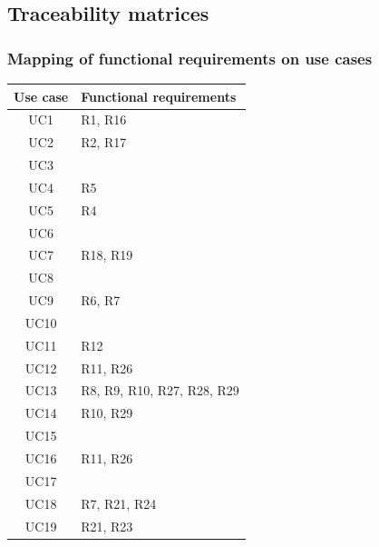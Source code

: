 \subsection{Traceability matrices}

\subsubsection*{Mapping of functional requirements on use cases}
\begin{center}
    \def\arraystretch{1.5}
    \begin{longtable}[H]{|c|l|}
        \hline
        \textbf{Use case} & \textbf{Functional requirements} \\ \hline
        UC1               & R1, R16                          \\ \hline
        UC2               & R2, R17                          \\ \hline
        UC3               &                                  \\ \hline
        UC4               & R5                               \\ \hline
        UC5               & R4                               \\ \hline
        UC6               &                                  \\ \hline
        UC7               & R18, R19                         \\ \hline
        UC8               &                                  \\ \hline
        UC9               & R6, R7                           \\ \hline
        UC10              &                                  \\ \hline
        UC11              & R12                              \\ \hline
        UC12              & R11, R26                         \\ \hline
        UC13              & R8, R9, R10, R27, R28, R29       \\ \hline
        UC14              & R10, R29                         \\ \hline
        UC15              &                                  \\ \hline
        UC16              & R11, R26                         \\ \hline
        UC17              &                                  \\ \hline
        UC18              & R7, R21, R24                     \\ \hline
        UC19              & R21, R23                         \\ \hline
    \end{longtable}
\end{center}

